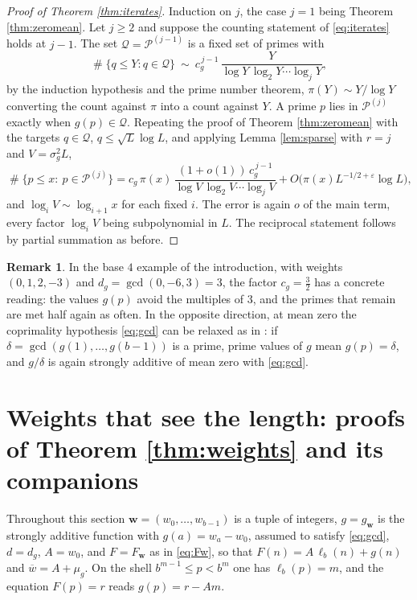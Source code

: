 \documentclass[11pt,reqno]{amsart}
\theoremstyle{plain}
\theoremstyle{definition}
\newtheorem{remark}[theorem]{Remark}
\DeclareMathOperator{\Card}{\#}
\begin{document}
\begin{proof}[Proof of Theorem \ref{thm:iterates}]
Induction on $j$, the case $j=1$ being Theorem \ref{thm:zeromean}. Let $j\ge2$ and suppose the counting statement of \eqref{eq:iterates} holds at $j-1$. The set $\mathcal Q=\mathcal P^{(j-1)}$ is a fixed set of primes with
\[
\Card\{q\le Y: q\in\mathcal Q\}\ \sim\ c_g^{\,j-1}\,\frac{Y}{\log Y\,\log_2Y\cdots\log_jY},
\]
by the induction hypothesis and the prime number theorem, $\pi(Y)\sim Y/\log Y$ converting the count against $\pi$ into a count against $Y$. A prime $p$ lies in $\mathcal P^{(j)}$ exactly when $g(p)\in\mathcal Q$. Repeating the proof of Theorem \ref{thm:zeromean} with the targets $q\in\mathcal Q$, $q\le\sqrt L\log L$, and applying Lemma \ref{lem:sparse} with $r=j$ and $V=\sigma_g^2L$,
\[
\Card\{p\le x:\ p\in\mathcal P^{(j)}\}
=c_g\,\pi(x)\,\frac{(1+o(1))\,c_g^{\,j-1}}{\log V\,\log_2V\cdots\log_jV}
+O\big(\pi(x)L^{-1/2+\varepsilon}\log L\big),
\]
and $\log_iV\sim\log_{i+1}x$ for each fixed $i$. The error is again $o$ of the main term, every factor $\log_iV$ being subpolynomial in $L$. The reciprocal statement follows by partial summation as before.
\end{proof}

\begin{remark}
In the base $4$ example of the introduction, with weights $(0,1,2,-3)$ and $d_g=\gcd(0,-6,3)=3$, the factor $c_g=\tfrac32$ has a concrete reading: the values $g(p)$ avoid the multiples of $3$, and the primes that remain are met half again as often. In the opposite direction, at mean zero the coprimality hypothesis \eqref{eq:gcd} can be relaxed as in \cite[Section 6.2]{vibefrtz}: if $\delta=\gcd(g(1),\dots,g(b-1))$ is a prime, prime values of $g$ mean $g(p)=\delta$, and $g/\delta$ is again strongly additive of mean zero with \eqref{eq:gcd}.
\end{remark}

\section{Weights that see the length: proofs of Theorem \ref{thm:weights} and its companions}\label{sec:weights}

Throughout this section $\mathbf w=(w_0,\dots,w_{b-1})$ is a tuple of integers, $g=g_{\mathbf w}$ is the strongly additive function with $g(a)=w_a-w_0$, assumed to satisfy \eqref{eq:gcd}, $d=d_{g}$, $A=w_0$, and $F=F_{\mathbf w}$ as in \eqref{eq:Fw}, so that $F(n)=A\,\ell_b(n)+g(n)$ and $\overline w=A+\mu_{g}$. On the shell $b^{m-1}\le p<b^m$ one has $\ell_b(p)=m$, and the equation $F(p)=r$ reads $g(p)=r-Am$.
\end{document}
